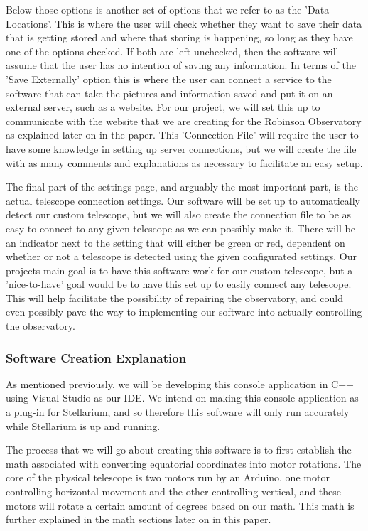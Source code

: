 \documentclass[12pt]{report}
\begin{document}
Below those options is another set of options that we refer to as the 'Data Locations'. This is where the user will check whether they want to save their data that is getting stored and where that storing is happening, so long as they have one of the options checked. If both are left unchecked, then the software will assume that the user has no intention of saving any information. In terms of the 'Save Externally' option this is where the user can connect a service to the software that can take the pictures and information saved and put it on an external server, such as a website. For our project, we will set this up to communicate with the website that we are creating for the Robinson Observatory as explained later on in the paper. This 'Connection File' will require the user to have some knowledge in setting up server connections, but we will create the file with as many comments and explanations as necessary to facilitate an easy setup.

\newpage

The final part of the settings page, and arguably the most important part, is the actual telescope connection settings. Our software will be set up to automatically detect our custom telescope, but we will also create the connection file to be as easy to connect to any given telescope as we can possibly make it. There will be an indicator next to the setting that will either be green or red, dependent on whether or not a telescope is detected using the given configurated settings. Our projects main goal is to have this software work for our custom telescope, but a 'nice-to-have' goal would be to have this set up to easily connect any telescope. This will help facilitate the possibility of repairing the observatory, and could even possibly pave the way to implementing our software into actually controlling the observatory. 


\subsubsection*{Software Creation Explanation}

As mentioned previously, we will be developing this console application in C++ using Visual Studio as our IDE. We intend on making this console application as a plug-in for Stellarium, and so therefore this software will only run accurately while Stellarium is up and running.

The process that we will go about creating this software is to first establish the math associated with converting equatorial coordinates into motor rotations. The core of the physical telescope is two motors run by an Arduino, one motor controlling horizontal movement and the other controlling vertical, and these motors will rotate a certain amount of degrees based on our math. This math is further explained in the math sections later on in this paper.
\end{document}
